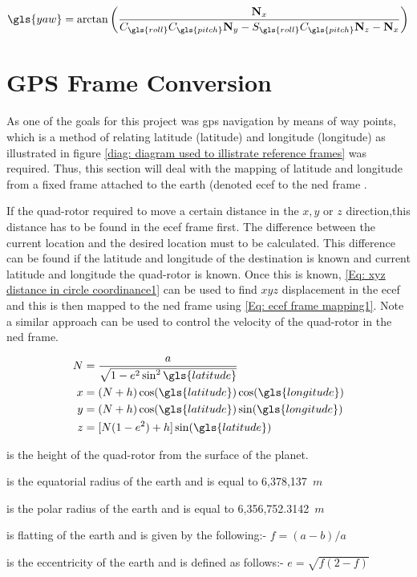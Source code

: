 \begin{equation}
	\gls{yaw} = \arctan\left( \frac{ {\bf N}_x}{C_{\gls{roll}}C_{\gls{pitch}}{\bf N}_y - S_{\gls{roll}}C_{\gls{pitch}}{\bf N}_z - {\bf N}_x }\right)
	\label{eq:yaw com equation}
\end{equation}




\section{GPS Frame Conversion} \label{sec: gps part}
As one of the goals for this project was \gls{gps} navigation by means of way points, which is a method of relating latitude (\gls{latitude}) and longitude (\gls{longitude}) as illustrated in figure \ref{diag: diagram used to illistrate reference frames} was required. Thus, this section will deal with the mapping of \gls{latitude} and \gls{longitude} from a fixed frame attached to the earth (denoted \gls{ecef} to the \gls{ned} frame \cite{crassidis2006sigma}. 


If the quad-rotor required to move a certain distance in the $x, y$ or $z$ direction,this  distance has to be found in the \gls{ecef} frame first. The difference between the current location and the desired location must to be calculated. This difference can be found if the \gls{latitude} and \gls{longitude} of the destination is known and current \gls{latitude} and \gls{longitude} the quad-rotor is known. Once this is known, \eqref{Eq: xyz distance in circle coordinance1} can be used to find $xyz$ displacement in the \gls{ecef} and this is then mapped to the \gls{ned} frame using \eqref{Eq: ecef frame mapping1}. Note a similar approach can be used to control the velocity of the quad-rotor in the \gls{ned} frame.


\begin{align}
	\begin{split}
		N &= \frac{a}{\sqrt{1 - e^2\sin^2\gls{latitude}}}\\
		x&= (N+h)\cos(\gls{latitude})\cos(\gls{longitude})\\
		y &= (N+h)\cos(\gls{latitude})\sin(\gls{longitude})\\
		z &= [N(1-e^2)+h]\sin(\gls{latitude})
	\end{split}
	\label{Eq: xyz distance in circle coordinance1}
\end{align}


{

\begin{description}[itemsep=1mm]
	\item[{\bf Where:-}]
	\item[$h$:] is the height of the quad-rotor from the surface of the planet.
	\item[$a$:] is the equatorial radius of the earth and is equal to 6,378,137~$m$
	\item[$b$:] is the polar radius of the earth and is equal to 6,356,752.3142~$m$
	\item[$f$:] is flatting of the earth and is given by the following:- $f = (a-b)/a$
	\item[$e$:] is the eccentricity of the earth and is defined as follows:- $e= \sqrt{f(2-f) }$
\end{description}
}


